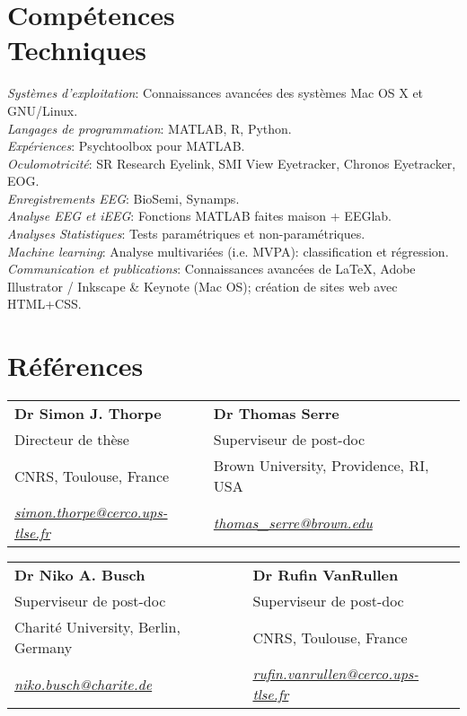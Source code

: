 \documentclass[margin,line]{resume}
\begin{document}
\begin{resume}
\section{\mysidestyle Compétences\\Techniques}
	\textsl{Systèmes d'exploitation}: Connaissances avancées des systèmes Mac OS X et GNU/Linux.\\
	\textsl{Langages de programmation}: MATLAB, R, Python.\\
	\textsl{Expériences}: Psychtoolbox pour MATLAB.\\
	\textsl{Oculomotricité}: SR Research Eyelink, SMI View Eyetracker, Chronos Eyetracker, EOG.\\
	\textsl{Enregistrements EEG}: BioSemi, Synamps.\\
	\textsl{Analyse EEG et iEEG}: Fonctions MATLAB faites maison + EEGlab.\\
	\textsl{Analyses Statistiques}: Tests paramétriques et non-paramétriques.\\
	\textsl{Machine learning}: Analyse multivariées (i.e. MVPA): classification et régression.\\
	\textsl{Communication et publications}: Connaissances avancées de \LaTeX, Adobe Illustrator / Inkscape \& Keynote (Mac OS); création de sites web avec HTML+CSS.


\vspace{3mm}
\section{\mysidestyle Références} 

	\begin{tabular}{@{}p{6cm}p{6cm}}
	\textbf{Dr Simon J. Thorpe}       &  \textbf{Dr Thomas Serre}                   \\
	Directeur de thèse                              &  Superviseur de post-doc                       \\
	CNRS, Toulouse, France          &  Brown University, Providence, RI, USA        \\
	\textsl{\href{mailto:simon.thorpe@cerco.ups-tlse.fr}{simon.thorpe@cerco.ups-tlse.fr}}   &  
	\textsl{\href{mailto:thomas_serre@brown.edu}{thomas\_serre@brown.edu}}    \\
	\end{tabular}
	
	\begin{tabular}{@{}p{6cm}p{6cm}}
	\textbf{Dr Niko A. Busch}       &  \textbf{Dr Rufin VanRullen}                   \\
	Superviseur de post-doc                   &  Superviseur de post-doc                       \\
	Charité University, Berlin, Germany         &  CNRS, Toulouse, France        \\
	\textsl{\href{mailto:niko.busch@charite.de}{niko.busch@charite.de}}  &  
	\textsl{\href{mailto:rufin.vanrullen@cerco.ups-tlse.fr}{rufin.vanrullen@cerco.ups-tlse.fr}}    \\
	\end{tabular}


	
\end{resume}
\end{document}
